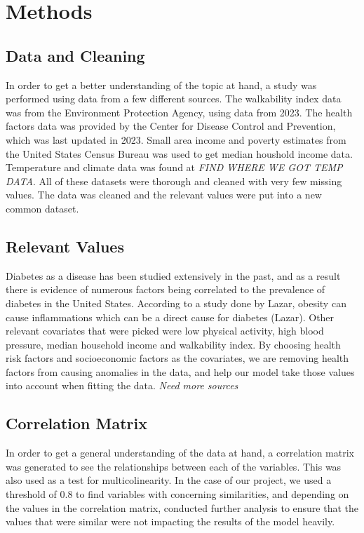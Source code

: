 \documentclass[
]{article}
\begin{document}
\section{Methods}\label{methods}

\subsection{Data and Cleaning}\label{data-and-cleaning}

In order to get a better understanding of the topic at hand, a study was
performed using data from a few different sources. The walkability index
data was from the Environment Protection Agency, using data from 2023.
The health factors data was provided by the Center for Disease Control
and Prevention, which was last updated in 2023. Small area income and
poverty estimates from the United States Census Bureau was used to get
median houshold income data. Temperature and climate data was found at
\emph{FIND WHERE WE GOT TEMP DATA}. All of these datasets were thorough
and cleaned with very few missing values. The data was cleaned and the
relevant values were put into a new common dataset.

\subsection{Relevant Values}\label{relevant-values}

Diabetes as a disease has been studied extensively in the past, and as a
result there is evidence of numerous factors being correlated to the
prevalence of diabetes in the United States. According to a study done
by Lazar, obesity can cause inflammations which can be a direct cause
for diabetes (Lazar). Other relevant covariates that were picked were
low physical activity, high blood pressure, median household income and
walkability index. By choosing health risk factors and socioeconomic
factors as the covariates, we are removing health factors from causing
anomalies in the data, and help our model take those values into account
when fitting the data. \emph{Need more sources}

\subsection{Correlation Matrix}\label{correlation-matrix}

In order to get a general understanding of the data at hand, a
correlation matrix was generated to see the relationships between each
of the variables. This was also used as a test for multicolinearity. In
the case of our project, we used a threshold of 0.8 to find variables
with concerning similarities, and depending on the values in the
correlation matrix, conducted further analysis to ensure that the values
that were similar were not impacting the results of the model heavily.
\end{document}
